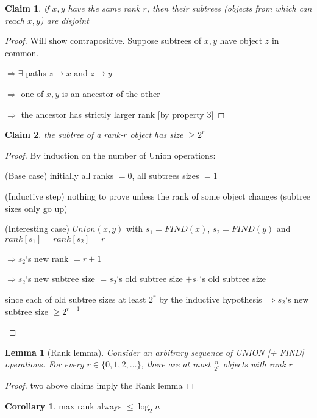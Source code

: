 \documentclass[a4paper,12pt]{article}
\theoremstyle{plain}
\newtheorem*{lemma}{Lemma}
\newtheorem{claim}{Claim}
\theoremstyle{definition}
\newtheorem*{corollary}{Corollary}
\theoremstyle{remark}
\begin{document}
\begin{claim}if $x, y$ have the same rank $r$, then their subtrees (objects from which can reach $x, y$) are disjoint\end{claim}
\begin{proof}
Will show contrapositive. Suppose subtrees of $x, y$ have object $z$ in common.

$\Rightarrow \exists$ paths $z \rightarrow x$ and $z \rightarrow y$

$\Rightarrow$ one of $x, y$ is an ancestor of the other

$\Rightarrow$ the ancestor has strictly larger rank [by property 3]
\end{proof}

\begin{claim}the subtree of a rank-$r$ object has size $\geq 2^r$\end{claim}
\begin{proof}
By induction on the number of Union operations:
\begin{description}
	\item{(Base case)} initially all ranks $= 0$, all subtrees sizes $= 1$
	\item{(Inductive step)} nothing to prove unless the rank of some object changes (subtree sizes only go up)
	\item{(Interesting case)} $Union(x, y)$ with $s_1 = FIND(x)$, $s_2 = FIND(y)$ and $rank[s_1] = rank[s_2] = r$

	$\Rightarrow s_2$`s new rank $= r + 1$

	$\Rightarrow s_2$`s new subtree size $= s_2$`s old subtree size $+ s_1$`s old subtree size

	since each of old subtree sizes at least $2^r$ by the inductive hypothesis $\Rightarrow s_2$`s new subtree size $\geq 2^{r+1}$
\end{description}
\end{proof}

\begin{lemma}[Rank lemma]Consider an arbitrary sequence of UNION [+ FIND] operations. For every $r \in \{0, 1, 2, \dots\}$, there are at most $\frac{n}{2^r}$ objects with rank $r$\end{lemma}
\begin{proof}two above claims imply the Rank lemma\end{proof}

\begin{corollary}max rank always $\leq \log_{2} n$\end{corollary}
\end{document}

